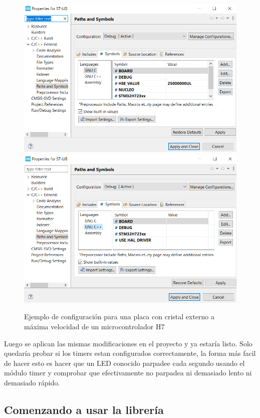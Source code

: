 \documentclass{report}
\begin{document}
\begin{figure}[h]
  \includegraphics[scale=0.45]{Imagenes/Modificar Simbolos ST-LIB.png}
  \includegraphics[scale=0.45]{Imagenes/Modificar Simbolos ST-LIB++.png}
  \caption{Ejemplo de configuración para una placa con cristal externo a máxima velocidad de un microcontrolador H7}
  \label{configSTLIBenviroment}
\end{figure}

Luego se aplican las mismas modificaciones en el proyecto y ya estaría listo. Solo quedaría probar si los timers estan configurados correctamente, la forma más facil de hacer esto es hacer que un LED conocido parpadee cada segundo usando el módulo timer y comprobar que efectivamente no parpadea ni demasiado lento ni demasiado rápido. 

\subsection{Comenzando a usar la librería}
\end{document}

